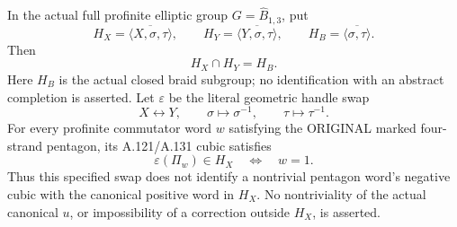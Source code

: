 In the actual full profinite elliptic group \(G=\widehat B_{1,3}\),
put
\[
 H_X=\overline{\langle X,\sigma,\tau\rangle},\qquad
 H_Y=\overline{\langle Y,\sigma,\tau\rangle},\qquad
 H_B=\overline{\langle\sigma,\tau\rangle}.
\]
Then
\[
                         H_X\cap H_Y=H_B .
 \tag{A.138.1}
\]
Here \(H_B\) is the actual closed braid subgroup; no identification
with an abstract completion is asserted. Let \(\varepsilon\) be
the literal geometric handle swap
\[
 X\longleftrightarrow Y,\qquad
 \sigma\longmapsto\sigma^{-1},\qquad
 \tau\longmapsto\tau^{-1}.
 \tag{A.138.2}
\]
For every profinite commutator word \(w\) satisfying the ORIGINAL
marked four-strand pentagon, its A.121/A.131 cubic satisfies
\[
             \varepsilon(\Pi_w)\in H_X
                      \quad\Longleftrightarrow\quad w=1 .
 \tag{A.138.3}
\]
Thus this specified swap does not identify a nontrivial pentagon
word's negative cubic with the canonical positive word in \(H_X\).
No nontriviality of the actual canonical \(u\), or impossibility
of a correction outside \(H_X\), is asserted.
